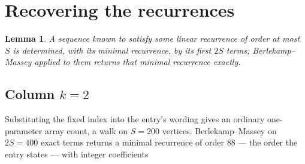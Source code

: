 \documentclass[11pt,a4paper]{article}
\theoremstyle{plain}
\newtheorem{lemma}[theorem]{Lemma}
\theoremstyle{definition}
\begin{document}
\section{Recovering the recurrences}

\begin{lemma}\label{lem:bm}
A sequence known to satisfy some linear recurrence of order at most $S$ is determined, with its
minimal recurrence, by its first $2S$ terms; Berlekamp--Massey applied to them returns that
minimal recurrence exactly.
\end{lemma}

\subsection*{Column $k=2$}
Substituting the fixed index into the entry's wording gives an ordinary one-parameter array
count, a walk on $S=200$ vertices. Berlekamp--Massey on $2S=400$ exact terms
returns a minimal recurrence of order $88$ --- the order the entry states --- with
integer coefficients
\end{document}

